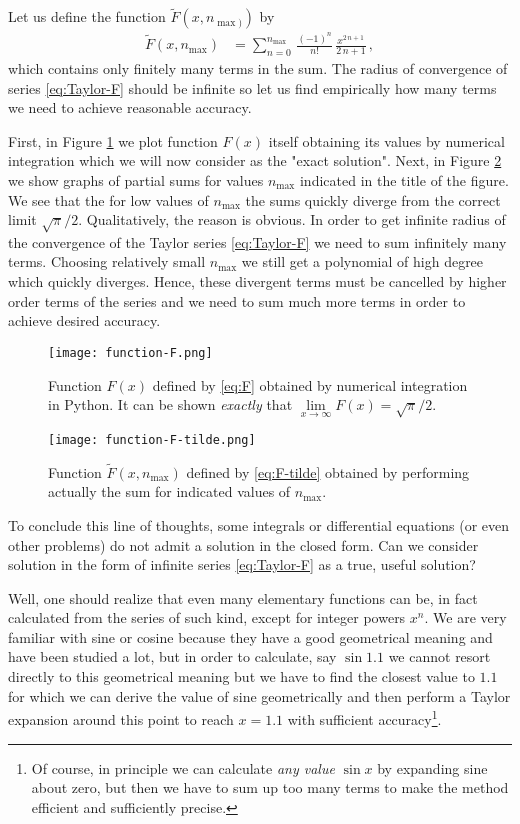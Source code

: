 Let us define the function $\widetilde{F}(x,n_{\max)})$ by
\begin{align}\label{eq:F-tilde}
    \widetilde{F}(x, n_{\max}) &= \sum_{n=0}^{n_{\max}}\,\frac{(-1)^n}{n!}\,\frac{x^{2\,n+1}}{2\,n+1}\, ,
\end{align}
which contains only finitely many terms in the sum. The radius of convergence of series \eqref{eq:Taylor-F} should be infinite so let us find empirically how many terms we need to achieve reasonable accuracy. 

First, in Figure \ref{fig:F}  we plot function $F(x)$ itself obtaining its values by numerical integration which we will now consider as the "exact solution". Next, in Figure \ref{fig:F-tilde} we show graphs of partial sums for values $n_{\max}$ indicated in the title of the figure. We see that the for low values of $n_{\max}$ the sums quickly diverge from the correct limit $\sqrt{\pi}/2$. Qualitatively, the reason is obvious. In order to get infinite radius of the convergence of the Taylor series \eqref{eq:Taylor-F} we need to sum infinitely many terms. Choosing relatively small $n_{\max}$ we still get a polynomial of high degree which quickly diverges. Hence, these divergent terms must be cancelled by higher order terms of the series and we need to sum much more terms in order to achieve desired accuracy. 

\begin{figure}
    \centering
    \texttt{[image: function-F.png]}
        \caption{Function $F(x)$ defined by \eqref{eq:F} obtained by numerical integration in Python. It can be shown {\itshape exactly} that $\lim\limits_{x \to \infty} F(x) = \sqrt{\pi}/2$.}
    \label{fig:F}
\end{figure}

\begin{figure}
    \centering
    \texttt{[image: function-F-tilde.png]}
        \caption{Function $\widetilde{F}(x,n_{\max})$ defined by \eqref{eq:F-tilde} obtained by performing actually the sum for indicated values of $n_{\max}$.}
    \label{fig:F-tilde}
\end{figure}

To conclude this line of thoughts, some integrals or differential equations (or even other problems) do not admit a solution in the closed form. Can we consider solution in the form of infinite series \eqref{eq:Taylor-F} as a true, useful solution?

Well, one should realize that even many elementary functions can be, in fact calculated from the series of such kind, except for integer powers $x^n$. We are very familiar with sine or cosine because they have a good geometrical meaning and have been studied a lot, but in order to calculate, say $\sin 1.1$ we cannot resort directly to this geometrical meaning but we have to find the closest value to $1.1$ for which we can derive the value of sine geometrically and then perform a Taylor expansion around this point to reach $x=1.1$ with sufficient accuracy\footnote{Of course, in principle we can calculate {\itshape any value} $\sin x$ by expanding sine about zero, but then we have to sum up too many terms to make the method efficient and sufficiently precise.}.

